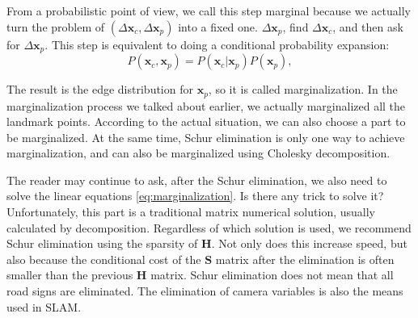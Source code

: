 From a probabilistic point of view, we call this step marginal because we actually turn the problem of $(\Delta \bm{x}_c, \Delta \bm{x}_p)$ into a fixed one. $\Delta \bm{x}_p$, find $\Delta \bm{x}_c$, and then ask for $\Delta \bm{x}_p$. This step is equivalent to doing a conditional probability expansion:
\begin{equation}
P( \bm{x}_c, \bm{x}_p ) = P(\bm{x}_c | \bm{x}_p ) P( \bm{x}_p ) ,
\end{equation}

The result is the edge distribution for $\bm{x}_p$, so it is called marginalization. In the marginalization process we talked about earlier, we actually marginalized all the landmark points. According to the actual situation, we can also choose a part to be marginalized. At the same time, Schur elimination is only one way to achieve marginalization, and can also be marginalized using Cholesky decomposition.

The reader may continue to ask, after the Schur elimination, we also need to solve the linear equations \eqref{eq:marginalization}. Is there any trick to solve it? Unfortunately, this part is a traditional matrix numerical solution, usually calculated by decomposition. Regardless of which solution is used, we recommend Schur elimination using the sparsity of $\bm{H}$. Not only does this increase speed, but also because the conditional cost of the $\bm{S}$ matrix after the elimination is often smaller than the previous $\bm{H}$ matrix. Schur elimination does not mean that all road signs are eliminated. The elimination of camera variables is also the means used in SLAM.

